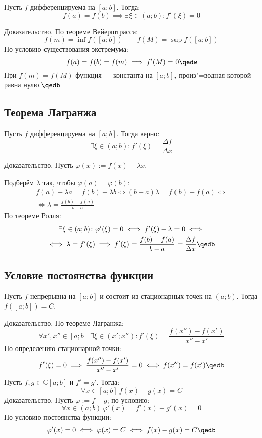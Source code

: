 \begin{theorem}
Пусть $f$ дифференцируема на $[a;b]$. Тогда:
$$f(a)=f(b)\implies\exists\xi\in(a;b)\colon f'(\xi)=0$$
\end{theorem}
{\bold Доказательство.} По теореме Вейерштрасса:
$$f(m)=\inf f([a;b])\quad\quad f(M)=\sup f([a;b])$$
По условию существования экстремума:
$$f(a)=f(b)=f(m)\implies f'(M)=0\qedw$$
При $f(m)=f(M)$ функция --- константа на $[a;b]$, произ"=водная которой равна нулю.$\qedb$

\subsection{Теорема Лагранжа}

\begin{theorem}
Пусть $f$ дифференцируема на $[a;b]$. Тогда верно:
$$\exists\xi\in(a;b)\colon f'(\xi)=\frac{\Delta f}{\Delta x}$$
\end{theorem}
{\bold Доказательство.} Пусть $\varphi(x):=f(x)-\lambda x$.

Подберём $\lambda$ так, чтобы $\varphi(a)=\varphi(b)$:
\begin{gather*}
f(a)-\lambda a=f(b)-\lambda b\iff (b-a)\lambda=f(b)-f(a)\iff\\
\iff\lambda=\frac{f(b)-f(a)}{b-a}
\end{gather*}
По теореме Ролля:
\begin{gather*}
\exists\xi\in(a;b)\colon\varphi'(\xi)=0\iff f'(\xi)-\lambda=0\iff\\
\iff\lambda=f'(\xi)\implies f'(\xi)=\frac{f(b)-f(a)}{b-a}=\frac{\Delta f}{\Delta x}\qedb
\end{gather*}

\subsection{Условие постоянства функции}

\begin{theorem}
Пусть $f$ непрерывна на $[a;b]$ и состоит из стационарных точек на $(a;b)$. Тогда 
$f([a;b])=C$.
\end{theorem}
{\bold Доказательство.} По теореме Лагранжа:
$$\forall x',x''\in[a;b]\ \exists\xi\in(x';x'')\colon f'(\xi)=\frac{f(x'')-f(x')}{x''-x'}
$$
По определению стационарной точки:
$$f'(\xi)=0\implies \frac{f(x'')-f(x')}{x''-x'}=0\iff f(x'')=f(x')\qedb$$
Пусть $f,g\in\mathbb{C}[a;b]$ и $f'=g'$. Тогда:
$$\forall x\in[a;b]\ f(x)-g(x)=C$$
{\bold Доказательство.} Пусть $\varphi:=f-g$; по условию:
$$\forall x\in(a;b)\ \varphi'(x)=f'(x)-g'(x)=0$$
По условию постоянства функции:
$$\varphi'(x)=0\iff\varphi(x)=C\iff f(x)-g(x)=C\qedb$$
